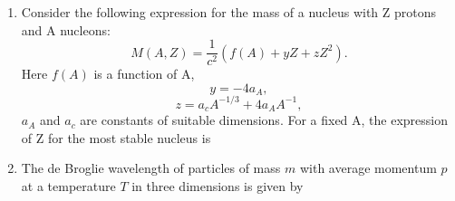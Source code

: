 \documentclass[14pt, a4paper]{extarticle}
\begin{document}
\begin{enumerate}[label=\textbf{Q. \arabic*}, start=21]
\item Consider the following expression for the mass of a nucleus with Z protons and A nucleons:
\[ M(A,Z) = \dfrac{1}{c^2}(f(A) + yZ + zZ^2). \]
Here $f(A)$ is a function of A,
\[ y = -4a_A, \]
\[ z = a_c A^{-1/3} + 4a_A A^{-1}, \]
$a_A$ and $a_c$ are constants of suitable dimensions. For a fixed A, the expression of Z for the most stable nucleus is
\begin{enumerate}[label=(\Alph*)]
\end{enumerate}

\item The de Broglie wavelength of particles of mass $m$ with average momentum $p$ at a temperature $T$ in three dimensions is given by
\begin{enumerate}[label=(\Alph*)]
\end{enumerate}


\end{enumerate}
\end{document}
